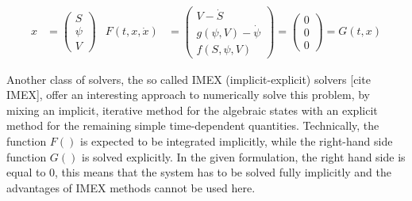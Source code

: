 \begin{align}
\label{eq:DAE_extended_formulation_SEAS}
	x &= \begin{pmatrix}
		S \\ \psi \\ V
	\end{pmatrix} & F(t, x,\dot{x}) &= \begin{pmatrix}
	 	V - \dot{S} \\ g(\psi, V) - \dot{\psi}  \\ f(S,\psi,V)
	\end{pmatrix} = \begin{pmatrix}
		0 \\ 0 \\ 0
	\end{pmatrix} = G(t,x)
\end{align}

Another class of solvers, the so called IMEX (implicit-explicit) solvers [cite IMEX], offer an interesting approach to numerically solve this problem, by mixing an implicit, iterative method for the algebraic states with an explicit method for the remaining simple time-dependent quantities. Technically, the function $F()$ is expected to be integrated implicitly, while the right-hand side function $G()$ is solved explicitly. In the given formulation, the right hand side is equal to 0, this means that the system has to be solved fully implicitly and the advantages of IMEX methods cannot be used here. 

